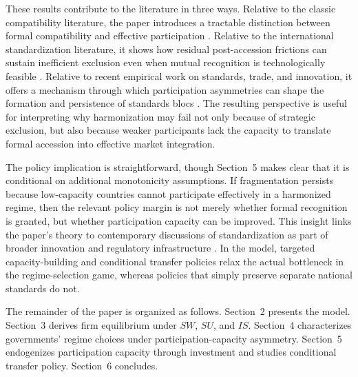 These results contribute to the literature in three ways. Relative to the classic compatibility literature, the paper introduces a tractable distinction between formal compatibility and effective participation \citep{FarrellSaloner1985,KatzShapiro1985,KatzShapiro1986,DavidGreenstein1990}. Relative to the international standardization literature, it shows how residual post-accession frictions can sustain inefficient exclusion even when mutual recognition is technologically feasible \citep{GandalShy2001,BarrettYang2001,Costinot2008,Klimenko2009}. Relative to recent empirical work on standards, trade, and innovation, it offers a mechanism through which participation asymmetries can shape the formation and persistence of standards blocs \citep{BlindPetersenRiillo2017,FoucartLi2021,BlindVonLaer2022,BlindKenneyLeiponenSimcoe2023,CloughertyGrajek2014,SchmidtSteingress2022,BlindMuench2024,WangZhu2025,Bjorkholt2026}. The resulting perspective is useful for interpreting why harmonization may fail not only because of strategic exclusion, but also because weaker participants lack the capacity to translate formal accession into effective market integration.

The policy implication is straightforward, though Section~5 makes clear that it is conditional on additional monotonicity assumptions. If fragmentation persists because low-capacity countries cannot participate effectively in a harmonized regime, then the relevant policy margin is not merely whether formal recognition is granted, but whether participation capacity can be improved. This insight links the paper's theory to contemporary discussions of standardization as part of broader innovation and regulatory infrastructure \citep{Tassey2017,BlindPetersenRiillo2017,BlindKenneyLeiponenSimcoe2023,BlindMuench2024}. In the model, targeted capacity-building and conditional transfer policies relax the actual bottleneck in the regime-selection game, whereas policies that simply preserve separate national standards do not.

The remainder of the paper is organized as follows. Section~2 presents the model. Section~3 derives firm equilibrium under $SW$, $SU$, and $IS$. Section~4 characterizes governments' regime choices under participation-capacity asymmetry. Section~5 endogenizes participation capacity through investment and studies conditional transfer policy. Section~6 concludes.
